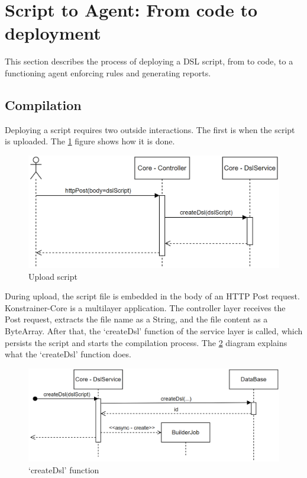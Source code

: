 \section[Script to Agent]{Script to Agent: From code to deployment}

This section describes the process of deploying a DSL script, from to code, to a functioning agent enforcing rules and generating reports.

\subsection{Compilation}

Deploying a script requires two outside interactions. The first is when the script is uploaded. The \ref{fig:seq0} figure shows how it is done.

\begin{figure}[h]
    \centering
    \includegraphics[width=130mm, keepaspectratio]{seq0.png}
    \caption{Upload script}
    \label{fig:seq0}
\end{figure}

During upload, the script file is embedded in the body of an HTTP Post request. Konstrainer-Core is a multilayer application. The controller layer receives the Post request, extracts the file name as a String, and the file content as a ByteArray. After that, the `createDsl' function of the service layer is called, which persists the script and starts the compilation process. The \ref{fig:seq1} diagram explains what the `createDsl' function does.

\begin{figure}[h]
    \centering
    \includegraphics[width=130mm, keepaspectratio]{seq1.png}
    \caption{`createDsl' function}
    \label{fig:seq1}
\end{figure}

